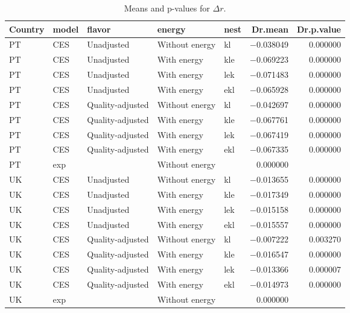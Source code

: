 \documentclass[preprint,authoryear,12pt]{elsarticle}\usepackage[]{graphicx}\usepackage[]{color}
\begin{document}
\begin{table}[ht]
\centering
\caption{Means and p-values for $\Delta r$.} 
\label{tab:Dr_p_values}
{\tiny
\begin{tabular}{lllllrr}
  \hline
Country & model & flavor & energy & nest & Dr.mean & Dr.p.value \\ 
  \hline
PT & CES & Unadjusted & Without energy & kl & $-$0.038049 & 0.000000 \\ 
  PT & CES & Unadjusted & With energy & kle & $-$0.069223 & 0.000000 \\ 
  PT & CES & Unadjusted & With energy & lek & $-$0.071483 & 0.000000 \\ 
  PT & CES & Unadjusted & With energy & ekl & $-$0.065928 & 0.000000 \\ 
  PT & CES & Quality-adjusted & Without energy & kl & $-$0.042697 & 0.000000 \\ 
  PT & CES & Quality-adjusted & With energy & kle & $-$0.067761 & 0.000000 \\ 
  PT & CES & Quality-adjusted & With energy & lek & $-$0.067419 & 0.000000 \\ 
  PT & CES & Quality-adjusted & With energy & ekl & $-$0.067335 & 0.000000 \\ 
  PT & exp &  & Without energy &  & 0.000000 &  \\ 
  UK & CES & Unadjusted & Without energy & kl & $-$0.013655 & 0.000000 \\ 
  UK & CES & Unadjusted & With energy & kle & $-$0.017349 & 0.000000 \\ 
  UK & CES & Unadjusted & With energy & lek & $-$0.015158 & 0.000000 \\ 
  UK & CES & Unadjusted & With energy & ekl & $-$0.015557 & 0.000000 \\ 
  UK & CES & Quality-adjusted & Without energy & kl & $-$0.007222 & 0.003270 \\ 
  UK & CES & Quality-adjusted & With energy & kle & $-$0.016547 & 0.000000 \\ 
  UK & CES & Quality-adjusted & With energy & lek & $-$0.013366 & 0.000007 \\ 
  UK & CES & Quality-adjusted & With energy & ekl & $-$0.014973 & 0.000000 \\ 
  UK & exp &  & Without energy &  & 0.000000 &  \\ 
   \hline
\end{tabular}
}
\end{table}



\end{document}
